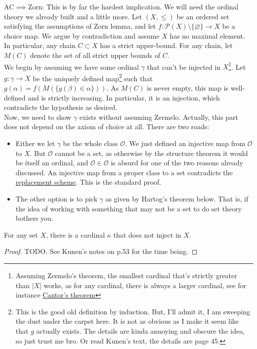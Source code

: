\documentclass{article}
\begin{document}
$\mathrm{AC} \implies \mathrm{Zorn}$: This is by far the hardest implication. We will need the ordinal theory we already built and a little more. Let $(X, \leq)$ be an ordered set satisfying the assumptions of Zorn lemma, and let $f: \mathcal{P}(X)\setminus\{\varnothing\} \to X$ be a choice map. We argue by contradiction and assume $X$ has no maximal element. In particular, any chain $C \subset X$ has a strict upper-bound. For any chain, let $M(C)$ denote the set of all strict upper bounds of $C$.\\

We begin by assuming we have some ordinal $\gamma$ that can't be injected in $X$\footnote{Assuming Zermelo's theorem, the smallest cardinal that's strictly greater than $|X|$ works, as for any cardinal, there is always a larger cardinal, see for instance \href{https://en.wikipedia.org/wiki/Cantor\%27s_theorem}{Cantor's theorem}}. Let $g: \gamma \to X$ be the uniquely defined map\footnote{This is the good old definition by induction. But, I'll admit it, I am sweeping the dust under the carpet here. It is not as obvious as I make it seem like that $g$ actually exists. The details are kinda annoying and obscure the idea, so just trust me bro. Or read Kunen's text, the details are page 45.} such that $g(\alpha) = f(M(\{g(\beta) \in \alpha\}))$. As $M(C)$ is never empty, this map is well-defined and is strictly increasing. In particular, it is an injection, which contradicts the hypothesis as desired.\\

Now, we need to show $\gamma$ exists without assuming Zermelo. Actually, this part does not depend on the axiom of choice at all. There are two roads:
\begin{itemize}
    \item Either we let $\gamma$ be the whole class $\mathcal{O}$. We just defined an injective map from $\mathcal{O}$ to $X$. But $\mathcal{O}$ cannot be a set, as otherwise by the structure theorem it would be itself an ordinal, and $\mathcal{O} \in \mathcal{O}$ is absurd for one of the two reasons already discussed. An injective map from a proper class to a set contradicts the \href{https://en.wikipedia.org/wiki/Axiom_schema_of_replacement}{replacement scheme}. This is the standard proof.
    \item  The other option is to pick $\gamma$ as given by Hartog's theorem below. That is, if the idea of working with something that may not be a set to do set theory bothers you. 
\end{itemize}

\begin{theorem}[Hartog, ZF]
    For any set $X$, there is a cardinal $\kappa$ that does not inject in $X$.
\end{theorem}

\begin{proof}
    TODO. See Kunen's notes on p.53 for the time being.
\end{proof}
\end{document}
